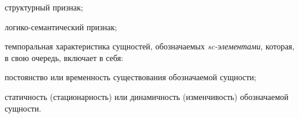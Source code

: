 \begin{textitemize}
	\item структурный признак;
	\item логико-семантический признак;
	\item темпоральная характеристика сущностей, обозначаемых \textit{sc-элементами}, которая, в свою очередь, включает в себя:
	\begin{textitemize}
		\item постоянство или временность существования обозначаемой сущности;
		\item статичность (стационарность) или динамичность (изменчивость) обозначаемой сущности.
	\end{textitemize}
\end{textitemize}

\begin{SCn}
	\scnstartstruct
	\begin{scnindent}
		\begin{scneqtoset}
			\begin{scnindent}
			\begin{scnsubdividing}
				\begin{scnindent}
				\begin{scnsubdividing}
					\begin{scnindent}
					\begin{scnsubdividing}
						\begin{scnindent}
							\begin{scnsubdividing}
								\begin{scnindent}
								\begin{scnsubdividing}
								\end{scnsubdividing}
								\end{scnindent}
							\end{scnsubdividing}

\end{scnindent}
\end{scnsubdividing}
\end{scnindent}
\end{scnsubdividing}
\end{scnindent}
\end{scnsubdividing}
\end{scnindent}
\end{scneqtoset}
\end{scnindent}
\end{SCn}
